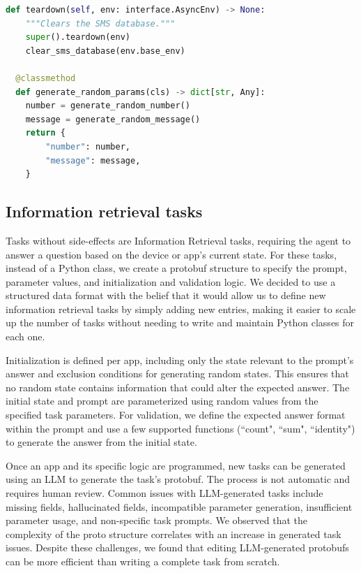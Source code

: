 \documentclass{article}
\begin{document}
\begin{appendices}
\begin{lstlisting}[language=Python, basicstyle=\ttfamily\footnotesize, style=mystyle]
  def teardown(self, env: interface.AsyncEnv) -> None:
    """Clears the SMS database."""
    super().teardown(env)
    clear_sms_database(env.base_env)

  @classmethod
  def generate_random_params(cls) -> dict[str, Any]:
    number = generate_random_number()
    message = generate_random_message()
    return {
        "number": number,
        "message": message,
    }
\end{lstlisting}


\subsection{Information retrieval tasks}
\label{sec:info_retrieval_details}

Tasks without side-effects are Information Retrieval tasks, requiring the agent to answer a question based on the device or app's current state. For these tasks, instead of a Python class, we create a protobuf structure to specify the prompt, parameter values, and initialization and validation logic. We decided to use a structured data format with the belief that it would allow us to define new information retrieval tasks by simply adding new entries, making it easier to scale up the number of tasks without needing to write and maintain Python classes for each one.

Initialization is defined per app, including only the state relevant to the prompt's answer and exclusion conditions for generating random states. This ensures that no random state contains information that could alter the expected answer. The initial state and prompt are parameterized using random values from the specified task parameters. For validation, we define the expected answer format within the prompt and use a few supported functions (``count", ``sum", ``identity") to generate the answer from the initial state.

Once an app and its specific logic are programmed, new tasks can be generated using an LLM to generate the task's protobuf. The process is not automatic and requires human review. Common issues with LLM-generated tasks include missing fields, hallucinated fields, incompatible parameter generation, insufficient parameter usage, and non-specific task prompts. We observed that the complexity of the proto structure correlates with an increase in generated task issues. Despite these challenges, we found that editing LLM-generated protobufs can be more efficient than writing a complete task from scratch.


\end{appendices}
\end{document}
